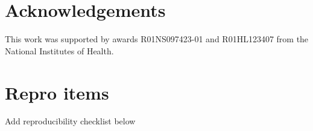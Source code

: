 \documentclass[preprint]{JASA}
\begin{document}
\hypertarget{acknowledgements}{%
\section*{Acknowledgements}\label{acknowledgements}}

This work was supported by awards R01NS097423-01 and R01HL123407 from
the National Institutes of Health.

\hypertarget{repro-items}{%
\section*{Repro items}\label{repro-items}}

Add reproducibility checklist below









\end{document}
